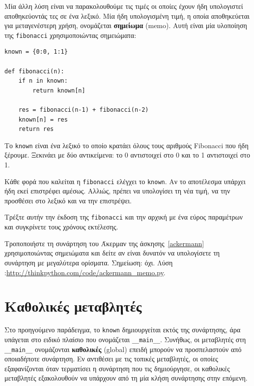 \documentclass[10pt]{book}
\begin{document}
Μία άλλη λύση είναι να παρακολουθούμε τις τιμές οι οποίες έχουν ήδη υπολογιστεί αποθηκεύοντάς τες σε ένα λεξικό. Μία ήδη υπολογισμένη τιμή, η οποία αποθηκεύεται για μεταγενέστερη χρήση, ονομάζεται {\bf σημείωμα} (memo). Αυτή είναι μία υλοποίηση της {\tt fibonacci} χρησιμοποιώντας σημειώματα: 

\begin{verbatim}
known = {0:0, 1:1}

def fibonacci(n):
    if n in known:
        return known[n]

    res = fibonacci(n-1) + fibonacci(n-2)
    known[n] = res
    return res
\end{verbatim}
%
Το {\tt known} είναι ένα λεξικό το οποίο κρατάει όλους τους αριθμούς Fibonacci  που ήδη ξέρουμε. Ξεκινάει με δύο αντικείμενα: το 0 αντιστοιχεί στο 0 και το 1 αντιστοιχεί στο 1.

Κάθε φορά που καλείται η {\tt fibonacci} ελέγχει το {\tt known}. Αν το αποτέλεσμα υπάρχει ήδη εκεί επιστρέφει αμέσως. Αλλιώς, πρέπει να υπολογίσει τη νέα τιμή, να την προσθέσει στο λεξικό και να την επιστρέψει.
\\
\begin{exercise}

Τρέξτε αυτήν την έκδοση της {\tt fibonacci} και την αρχική με ένα εύρος παραμέτρων και συγκρίνετε τους χρόνους εκτέλεσης.

\end{exercise}

\begin{exercise}

Τροποποιήστε τη συνάρτηση του Άκερμαν της άσκησης~\ref{ackermann}  χρησιμοποιώντας σημειώματα και δείτε αν είναι δυνατόν να υπολογίσετε τη συνάρτηση με μεγαλύτερα ορίσματα. Σημείωση: όχι. Λύση :\url{http://thinkpython.com/code/ackermann_memo.py}.
\end{exercise}


 
\section{Καθολικές μεταβλητές}

Στο προηγούμενο παράδειγμα, το {\tt known} δημιουργείται εκτός της συνάρτησης, άρα υπάγεται στο ειδικό πλαίσιο που ονομάζεται \verb"__main__". Συνήθως, οι μεταβλητές στη \verb"__main__" ονομάζονται {\bf καθολικές} (global) επειδή μπορούν να προσπελαστούν από οποιαδήποτε συνάρτηση. Εν αντιθέσει με τις τοπικές μεταβλητές, οι οποίες εξαφανίζονται όταν τερματίσει η συνάρτηση που τις δημιούργησε, οι καθολικές μεταβλητές εξακολουθούν να υπάρχουν από τη μία κλήση συνάρτησης στην επόμενη.
\end{document}
